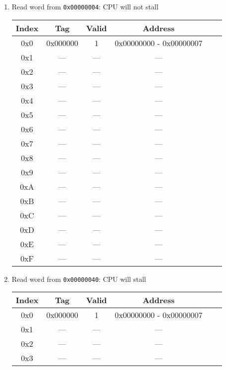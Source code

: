\documentclass[12pt,letterpaper,titlepage]{article}
\begin{document}
\begin{raggedright}
\begin{enumerate}
\begin{center}
\begin{tabular}{|c|c|c|c|c|c|}
\end{tabular}
\end{center}
\pagebreak
    \item Read word from \texttt{0x00000004}: CPU will not stall
\begin{center}
\def\arraystretch{1.35}
\begin{tabular}{|c|c|c|c|c|c|}
  \hline Index & Tag      & Valid & Address    
\\\hline 0x0   & 0x000000 & 1     & 0x00000000 - 0x00000007
\\\hline 0x1   & ---      & ---   & ---        
\\\hline 0x2   & ---      & ---   & ---        
\\\hline 0x3   & ---      & ---   & ---        
\\\hline 0x4   & ---      & ---   & ---        
\\\hline 0x5   & ---      & ---   & ---        
\\\hline 0x6   & ---      & ---   & ---        
\\\hline 0x7   & ---      & ---   & ---        
\\\hline 0x8   & ---      & ---   & ---        
\\\hline 0x9   & ---      & ---   & ---        
\\\hline 0xA   & ---      & ---   & ---        
\\\hline 0xB   & ---      & ---   & ---        
\\\hline 0xC   & ---      & ---   & ---        
\\\hline 0xD   & ---      & ---   & ---        
\\\hline 0xE   & ---      & ---   & ---        
\\\hline 0xF   & ---      & ---   & ---        
\\\hline
\end{tabular}
\end{center}
\pagebreak
    \item Read word from \texttt{0x00000040}: CPU will stall
\begin{center}
\def\arraystretch{1.35}
\begin{tabular}{|c|c|c|c|c|c|}
  \hline Index & Tag      & Valid & Address    
\\\hline 0x0   & 0x000000 & 1     & 0x00000000 - 0x00000007
\\\hline 0x1   & ---      & ---   & ---        
\\\hline 0x2   & ---      & ---   & ---        
\\\hline 0x3   & ---      & ---   & ---        

\end{tabular}
\end{center}
\end{enumerate}
\end{raggedright}
\end{document}
